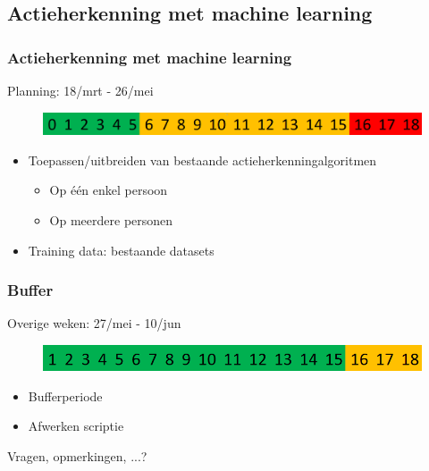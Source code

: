 \documentclass[]{beamer}
\begin{document}
	\subsection{Actieherkenning met machine learning}
		\begin{frame}
		\frametitle{Actieherkenning met machine learning}
		Planning: 18/mrt - 26/mei
		\begin{figure}
		\includegraphics[width=\textwidth]{actieherkenning}
		\end{figure}
		\begin{itemize}
			\item<1- > Toepassen/uitbreiden van bestaande actieherkenningalgoritmen
			\begin{itemize}
				\item Op één enkel persoon
				\item Op meerdere personen
			\end{itemize}
			\item<2- > Training data: bestaande datasets
		\end{itemize}
	\end{frame}
	
	\begin{frame}
	\frametitle{Buffer}
	Overige weken: 27/mei - 10/jun
	\begin{figure}
		\includegraphics[width=\textwidth]{buffer}
	\end{figure}
	\begin{itemize}
	\item Bufferperiode
	\item Afwerken scriptie
	\end{itemize}
	\end{frame}
	
	\begin{frame}
		\begin{center}
			\Huge Vragen, opmerkingen, ...?
		\end{center}
	\end{frame}
\end{document}
